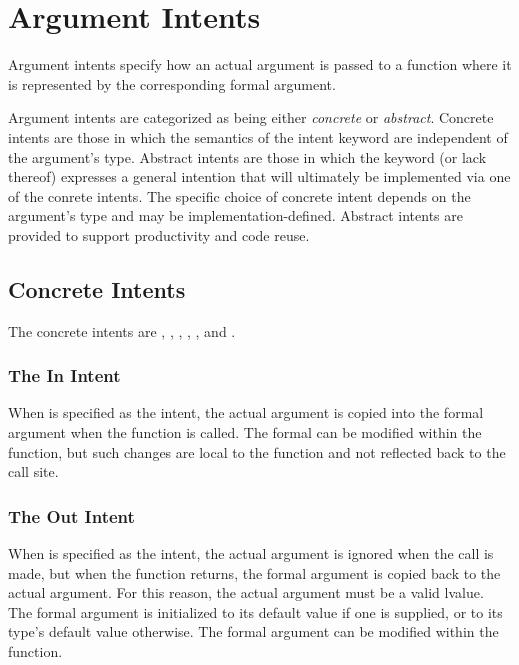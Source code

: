 \section{Argument Intents}
\label{Argument_Intents}

Argument intents specify how an actual argument is passed to a
function where it is represented by the corresponding formal argument.

Argument intents are categorized as being either \emph{concrete}
or \emph{abstract}.  Concrete intents are those in which the semantics
of the intent keyword are independent of the argument's type.
Abstract intents are those in which the keyword (or lack thereof)
expresses a general intention that will ultimately be implemented via
one of the conrete intents.  The specific choice of concrete intent
depends on the argument's type and may be implementation-defined.
Abstract intents are provided to support productivity and code reuse.

\subsection{Concrete Intents}
\label{Concrete Intents}

The concrete intents are , , ,
, , and .

\subsubsection{The In Intent}
\label{The_In_Intent}

When  is specified as the intent, the actual argument is
copied into the formal argument when the function is called.  The
formal can be modified within the function, but such changes are local
to the function and not reflected back to the call site.


\subsubsection{The Out Intent}
\label{The_Out_Intent}

When  is specified as the intent, the actual argument is
ignored when the call is made, but when the function returns, the
formal argument is copied back to the actual argument.  For this
reason, the actual argument must be a valid lvalue.  The formal
argument is initialized to its default value if one is supplied, or to
its type's default value otherwise.  The formal argument can be
modified within the function.


